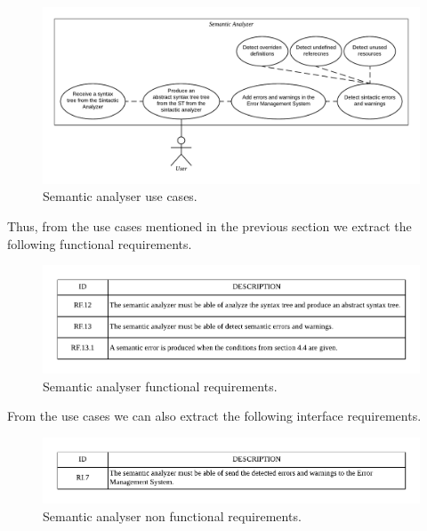 \begin{figure}[h!]
    \includegraphics[scale=0.6]{images/sema-use-case.pdf}
    \centering
    \caption[Semantic analyser use cases]{Semantic analyser use cases.}
    \label{fig:sema-use-case}
\end{figure}

Thus, from the use cases mentioned in the previous section we
extract the following functional requirements.

\begin{figure}[h!]
    \includegraphics[width=\textwidth]{images/sema-reqf.pdf}
    \centering
    \caption[Semantic analyser functional requirements]{Semantic analyser functional requirements.}
    \label{fig:sema-reqf}
\end{figure}

From the use cases we can also extract the following interface requirements.

\begin{figure}[h!]
    \includegraphics[width=\textwidth]{images/sema-reqnf.pdf}
    \centering
    \caption[Semantic analyser non functional requirements]{Semantic analyser non functional requirements.}
    \label{fig:sema-reqnf}
\end{figure}

